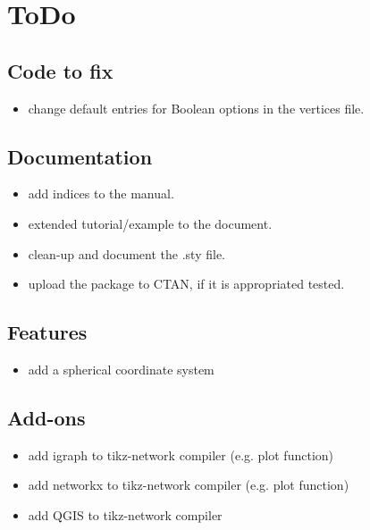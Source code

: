 \documentclass[a4paper,twosided,notoc]{tufte-book}
\begin{document}
\appendix
\chapter{ToDo}
\label{chap:todo}

\section{Code to fix}
\begin{itemize}
\item change default entries for Boolean options in the vertices file.
\end{itemize}

\section{Documentation}
\begin{itemize}
\item add indices to the manual.
\item extended tutorial/example to the document.
\item clean-up and document the .sty file.
\item upload the package to CTAN, if it is appropriated tested.
\end{itemize}

\section{Features}
\begin{itemize}
\item add a spherical coordinate system
\end{itemize}

\section{Add-ons}
\begin{itemize}
\item add igraph to tikz-network compiler (e.g. plot function)
\item add networkx to tikz-network compiler (e.g. plot function)
\item add QGIS to tikz-network compiler
\end{itemize}








\backmatter





\printindex
\end{document}
